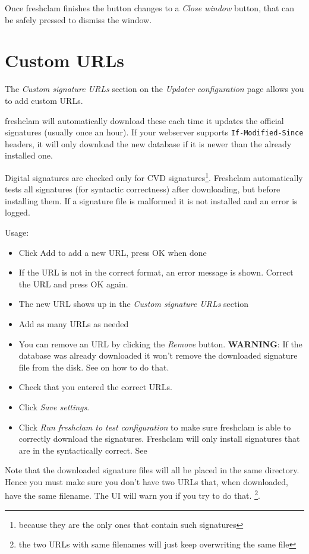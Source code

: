 Once \gls{freshclam} finishes the button changes to a \emph{Close window} button, that can be safely pressed to dismiss the window.

\section{Custom URLs}
\label{sec:ui_urladd}
The \emph{Custom signature URLs} section on the \emph{Updater configuration}
page allows you to add custom URLs.

\Gls{freshclam} will automatically download these each time it updates the official signatures (usually once an hour).
If your webserver supports \verb+If-Modified-Since+ headers, it will only
download the new database if it is newer than the already installed one.

Digital signatures  are checked only for \gls{CVD} signatures\footnote{because they are the only ones that contain such signatures}.
Freshclam automatically tests all signatures (for syntactic correctness) after downloading, but
before installing them. If a signature file is malformed it is not installed and
an error is logged.

Usage:
\begin{itemize}
\item Click Add to add a new URL, press OK when done
\item If the URL is not in the correct format, an error message is shown.
Correct the URL and press OK again.
\item The new URL shows up in the \emph{Custom signature URLs} section
\item Add as many URLs as needed
\item You can remove an URL by clicking the \emph{Remove} button.
\textbf{WARNING}: If the database was already downloaded it won't remove the downloaded signature file from the disk.
See  on how to do that.
\item Check that you entered the correct URLs.
\item Click \emph{Save settings}.
\item Click \emph{Run freshclam to test configuration} to make sure freshclam is
able to correctly download the signatures. Freshclam will only install
signatures that are in the syntactically correct.
See 
\end{itemize}

Note that the downloaded signature files will all be placed in the same directory. Hence you must make sure you don't have two URLs that, when downloaded, have the same filename.
The UI will warn you if you try to do that. \footnote{the two URLs with same filenames will just keep overwriting the same file}.
